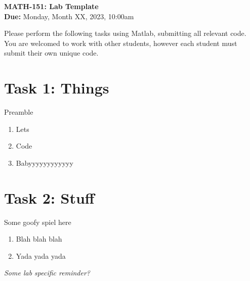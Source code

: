 \documentclass[11pt]{article}
\begin{document}
	
	\begin{center}
		\Large{\textbf{MATH-151: Lab Template}}\\
			\medskip
		\normalsize{\textbf{Due:} Monday, Month XX, 2023, 10:00am} 
	\end{center}
	\noindent\makebox[\linewidth]{\rule{\textwidth}{0.4pt}}
	Please perform the following tasks using Matlab, submitting all relevant code. You are welcomed to work with other students, however each student must submit their own unique code.
	\section*{Task 1: Things}
	\noindent Preamble
	\begin{enumerate}[label=\alph*)]
		\item Lets
		\item Code
		\item Babyyyyyyyyyyyy
	\end{enumerate}
	\section*{Task 2: Stuff}
	\noindent Some goofy spiel here\\
	\begin{enumerate}[label=\alph*)]
		\item Blah blah blah
		\item Yada yada yada 
	\end{enumerate}

	\begin{center}
		\vfill
		\textit{Some lab specific reminder?}
	\end{center}
\end{document}

